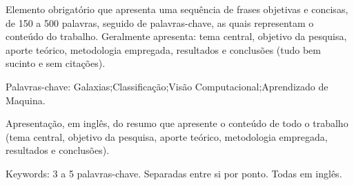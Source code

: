 \begin{resumo}
Elemento obrigatório que apresenta uma sequência de frases objetivas e concisas, de 150 a 500 palavras, seguido de palavras-chave, as quais representam o conteúdo do trabalho. Geralmente apresenta: tema central, objetivo da pesquisa, aporte teórico, metodologia empregada, resultados e conclusões (tudo bem sucinto e sem citações).


Palavras-chave: Galaxias;Classificação;Visão Computacional;Aprendizado de Maquina.

\end{resumo}

\begin{resumo}[Abstract]
Apresentação, em inglês, do resumo que apresente o conteúdo de todo o trabalho (tema central, objetivo da pesquisa, aporte teórico, metodologia empregada, resultados e conclusões).


Keywords: 3 a 5 palavras-chave. Separadas entre si por ponto. Todas em inglês.
\end{resumo}